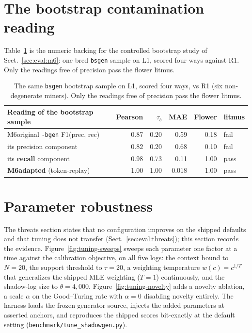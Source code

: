 \documentclass[runningheads]{llncs}
\begin{document}
\section{The bootstrap contamination reading}
\label{sec:appendix:m6}
Table~\ref{tab:m6} is the numeric backing for the controlled bootstrap study of Sect.~\ref{sec:eval:m6}: one bred \texttt{bsgen} sample on L1, scored four ways against R1. Only the readings free of precision pass the flower litmus.

\begin{table}[h]
\centering
\caption{The same \texttt{bsgen} bootstrap sample on L1, scored four ways, vs R1 (six non-degenerate miners). Only the readings free of precision pass the flower litmus.}
\label{tab:m6}
\setlength{\tabcolsep}{5pt}
\footnotesize
\begin{tabular}{@{}lrrrrl@{}}
\toprule
Reading of the bootstrap sample & Pearson & $\tau_b$ & MAE & Flower & litmus \\
\midrule
M6original \texttt{-bgen} F1(prec, rec) & 0.87 & 0.20 & 0.59 & 0.18 & fail \\
\quad its precision component & 0.82 & 0.20 & 0.68 & 0.10 & fail \\
\quad its \textbf{recall} component & 0.98 & 0.73 & 0.11 & 1.00 & pass \\
\textbf{M6adapted} (token-replay) & 1.00 & 1.00 & 0.018 & 1.00 & pass \\
\bottomrule
\end{tabular}
\end{table}

\section{Parameter robustness}
\label{sec:appendix:tuning}
The threats section states that no configuration improves on the shipped defaults and that tuning does not transfer (Sect.~\ref{sec:eval:threats}); this section records the evidence. Figure~\ref{fig:tuning-sweeps} sweeps each parameter one factor at a time against the calibration objective, on all five logs: the context bound to $N{=}20$, the support threshold to $\tau{=}20$, a weighting temperature $w(c)=c^{1/T}$ that generalizes the shipped MLE weighting ($T{=}1$) continuously, and the shadow-log size to $\theta{=}4{,}000$. Figure~\ref{fig:tuning-novelty} adds a novelty ablation, a scale $\alpha$ on the Good--Turing rate with $\alpha{=}0$ disabling novelty entirely. The harness loads the frozen generator source, injects the added parameters at asserted anchors, and reproduces the shipped scores bit-exactly at the default setting (\texttt{benchmark/tune\_shadowgen.py}).
\end{document}
